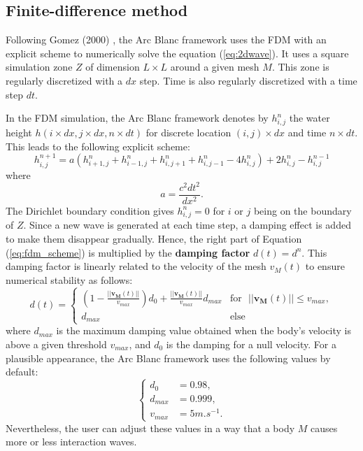 \documentclass[final]{jcgt}
\def\framework{the Arc Blanc framework\xspace}
\begin{document}
\subsection{Finite-difference method}
\label{subsec:finiteDifferenceMethod}
Following Gomez (2000) \cite{gomezInteractiveSimulationWater2000},
\framework  uses the FDM with an explicit scheme to numerically solve the equation (\ref{eq:2dwave}).
It uses a square simulation zone $Z$ of dimension $L\times L$ around a given mesh $M$.
This zone is regularly discretized with a $dx$ step.
Time is also regularly discretized with a time step $dt$.

In the FDM simulation, \framework denotes by $h_{i,j}^n$ the water height $h(i\times dx,j\times dx,n \times dt)$ for discrete location $(i,j)\times dx$ and time $n\times dt$.
This leads to the following explicit scheme:
\begin{equation}
	\label{eq:fdm_scheme}
	h_{i,j}^{n+1} = a\left(h_{i+1,j}^n+h_{i-1,j}^n+h_{i,j+1}^n+h_{i,j-1}^n-4h_{i,j}^n\right) + 2h_{i,j}^n - h_{i,j}^{n-1}
\end{equation}
where
\begin{equation}
	a=\frac{c^2dt^2}{dx^2}.
\end{equation}
The Dirichlet boundary condition gives $h_{i,j}^n=0$ for $i$ or $j$ being on the boundary of $Z$.
Since a new wave is generated at each time step, a damping effect is added to make them disappear gradually.
Hence, the right part of Equation (\ref{eq:fdm_scheme}) is multiplied by the \textbf{damping factor} $d(t)=d^n$.
This damping factor is linearly related to the velocity of the mesh $v_M(t)$ to ensure numerical stability as follows:
\begin{equation}
	d(t) =
	\begin{cases}
		\left(1-\frac{||\mathbf{v_M}(t)||}{v_{max}}\right)d_0 + \frac{||\mathbf{v_M}(t)||}{v_{max}}d_{max} & \text{for~~}||\mathbf{v_M}(t)||\leq v_{max}, \\
		d_{max}                                                                          & \text{else}
	\end{cases}
\end{equation}
where $d_{max}$ is the maximum damping value obtained when the body's velocity is above a given threshold $v_{max}$,
and $d_0$ is the damping for a null velocity.
For a plausible appearance, \framework uses the following values by default:
\begin{equation}
	\begin{cases}
		d_0     & = 0.98,       \\
		d_{max} & = 0.999,      \\
		v_{max} & = 5 m.s^{-1}.
	\end{cases}
\end{equation}
Nevertheless, the user can adjust these values in a way that a body $M$ causes more or less interaction waves.
\end{document}
